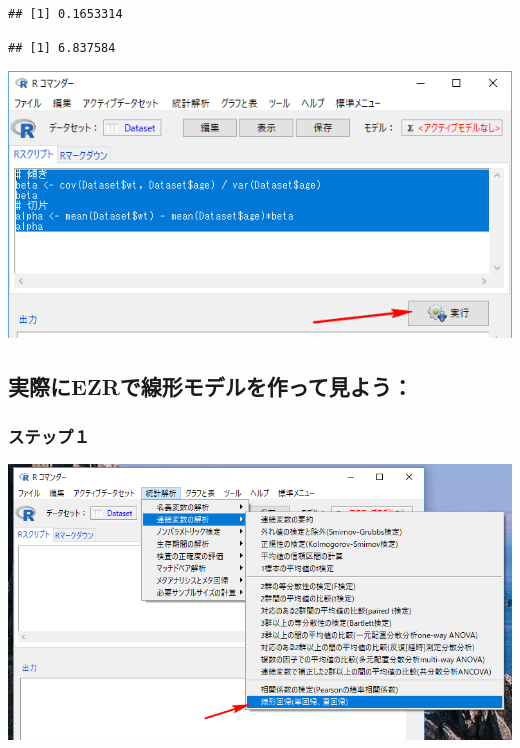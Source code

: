 \documentclass[11pt,]{problemset}
\newenvironment{Shaded}{\begin{snugshade}}{\end{snugshade}}
\newcommand{\CommentTok}[1]{\textcolor[rgb]{0.56,0.35,0.01}{\textit{#1}}}
\newcommand{\KeywordTok}[1]{\textcolor[rgb]{0.13,0.29,0.53}{\textbf{#1}}}
\newcommand{\NormalTok}[1]{#1}
\newcommand{\OperatorTok}[1]{\textcolor[rgb]{0.81,0.36,0.00}{\textbf{#1}}}
\newcommand{\StringTok}[1]{\textcolor[rgb]{0.31,0.60,0.02}{#1}}
\begin{document}
\begin{verbatim}
## [1] 0.1653314
\end{verbatim}

\begin{Shaded}
\end{Shaded}

\begin{verbatim}
## [1] 6.837584
\end{verbatim}

\begin{center}\includegraphics[width=0.75\linewidth]{pic/betaalpha} \end{center}

\hypertarget{ezr}{%
\subsection{実際にEZRで線形モデルを作って見よう：}\label{ezr}}

\hypertarget{-5}{%
\subsubsection{ステップ１}\label{-5}}

\begin{center}\includegraphics[width=0.8\linewidth]{pic/lm00} \end{center}
\end{document}
